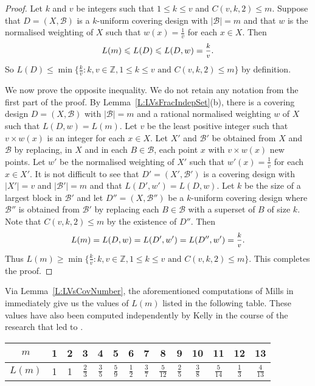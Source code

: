 \documentclass[11pt]{article}
\theoremstyle{definition}
\renewcommand{\leq}{\leqslant}
\renewcommand{\geq}{\geqslant}
\newcommand{\B}{{\ensuremath{\mathcal{B}}}}
\begin{document}
\begin{proof}
Let $k$ and $v$ be integers such that $1 \leq k \leq v$ and $C(v,k,2) \leq m$. Suppose that $D=(X,\B)$ is a $k$-uniform covering design with $|\B|=m$ and that $w$ is the normalised weighting of $X$ such that $w(x)=\frac{1}{v}$ for each $x \in X$. Then
\[L(m) \leq L(D) \leq L(D,w) = \mfrac{k}{v}.\]
So $L(D) \leq \min\{\frac{k}{v}:k,v \in \mathbb{Z}, 1 \leq k \leq v \text{ and } C(v,k,2) \leq m\}$ by definition.

We now prove the opposite inequality. We do not retain any notation from the first part of the proof. By Lemma~\ref{L:LVsFracIndepSet}(b), there is a covering design $D=(X,\B)$ with $|\B|=m$ and a rational normalised weighting $w$  of $X$ such that $L(D,w) = L(m)$. Let $v$ be the least positive integer such that $v \times w(x)$ is an integer for each $x \in X$. Let $X'$ and $\B'$ be obtained from $X$ and $\B$ by replacing, in $X$ and in each $B \in \B$, each point $x$ with $v \times w(x)$ new points. Let $w'$ be the normalised weighting of $X'$ such that $w'(x)=\frac{1}{v}$ for each $x \in X'$. It is not difficult to see that $D'=(X',\B')$ is a covering design with $|X'|=v$ and $|\B'|=m$ and that $L(D',w')=L(D,w)$. Let $k$ be the size of a largest block in $\B'$ and let $D''=(X,\B'')$ be a $k$-uniform covering design where $\B''$ is obtained from $\B'$ by replacing each $B \in \B$ with a superset of $B$ of size $k$. Note that $C(v,k,2) \leq m$ by the existence of $D''$. Then
\[L(m)=L(D,w)=L(D',w')=L(D'',w')=\mfrac{k}{v}.\]
Thus $L(m) \geq \min\{\frac{k}{v}:k,v \in \mathbb{Z}, 1 \leq k \leq v \text{ and } C(v,k,2) \leq m\}$. This completes the proof.
\end{proof}

Via Lemma~\ref{L:LVsCovNumber}, the aforementioned computations of Mills in \cite{Mil} immediately give us the values of $L(m)$ listed in the following table. These values have also been computed independently by Kelly \cite{Kel} in the course of the research that led to \cite{HalKelTia}.

\begin{center}
\begin{tabular}{c|ccccccccccccc}
     $m$&  1 & 2 & 3 & 4 & 5 & 6 & 7 & 8 & 9 & 10 & 11 & 12 & 13\\\hline
     $L(m)$\rule{0cm}{4mm}& 1 & 1 & $\frac{2}{3}$ & $\frac{3}{5}$ & $\frac{5}{9}$ & $\frac{1}{2}$ & $\frac{3}{7}$ & $\frac{5}{12}$ & $\frac{2}{5}$ & $\frac{3}{8}$ & $\frac{5}{14}$ & $\frac{1}{3}$ & $\frac{4}{13}$
\end{tabular}
\end{center}
\end{document}
